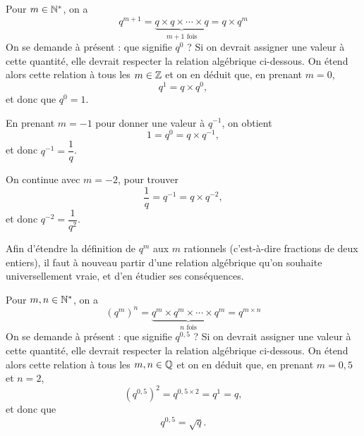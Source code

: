 Pour $m\in\mathbb{N}^*$, on a 
	\[ q^{m+1} = \underbrace{q \times q \times \cdots \times q}_{\text{$m+1$ fois}} = q \times q^{m} \]
On se demande à présent : que signifie $q^0$ ?
Si on devrait assigner une valeur à cette quantité, elle devrait respecter la relation algébrique ci-dessous.
On étend alors cette relation à tous les $m\in\mathbb{Z}$ et on en déduit que, en prenant $m=0$,
	\[ q^1 = q \times q^{0}, \]
et donc que $q^0 = 1$.

En prenant $m=-1$ pour donner une valeur à $q^{-1}$, on obtient
	\[ 1 = q^{0} = q \times q^{-1}, \]
et donc $q^{-1} = \dfrac1q$.

On continue avec $m=-2$, pour trouver
	\[ \dfrac1q = q^{-1} = q \times q^{-2}, \]
et donc $q^{-2} = \dfrac1{q^2}$.




Afin d'étendre la définition de $q^m$ aux $m$ rationnels (c'est-à-dire fractions de deux entiers), il faut à nouveau partir d'une relation algébrique qu'on souhaite universellement vraie, et d'en étudier ses conséquences.

Pour $m, n \in \mathbb{N}^*$, on a 
	\[ \left( q^m \right)^n = \underbrace{q^m \times q^m \times \cdots \times q^m}_{\text{$n$ fois}} = q^{m \times n} \]
On se demande à présent : que signifie $q^{0,5}$ ?
Si on devrait assigner une valeur à cette quantité, elle devrait respecter la relation algébrique ci-dessous.
On étend alors cette relation à tous les $m, n\in\mathbb{Q}$ et on en déduit que, en prenant $m=0,5$ et $n=2$,
	\[ \left( q^{0,5} \right)^2 = q^{0,5 \times 2} = q^{1} = q, \]
et donc que 
	\[ q^{0,5} = \sqrt{q}. \]
	
